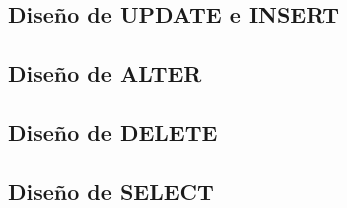 \subsection{Diseño de UPDATE e INSERT}

\subsection{Diseño de ALTER}

\subsection{Diseño de DELETE}

\subsection{Diseño de SELECT}
